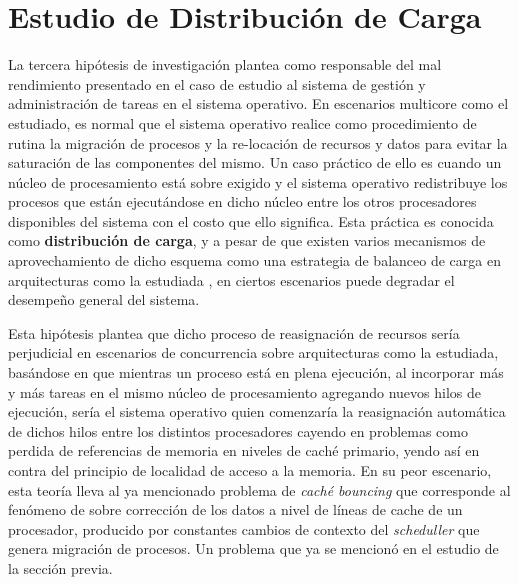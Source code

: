 \chapter{Estudio de Distribución de Carga}
La tercera hipótesis de investigación plantea como responsable del mal rendimiento presentado en el caso de estudio al sistema de gestión y administración de tareas en el sistema operativo. En escenarios multicore como el estudiado, es normal que el sistema operativo realice como procedimiento de rutina la migración de procesos y la re-locación de recursos y datos para evitar la saturación de las componentes del mismo. Un caso práctico de ello es cuando un núcleo de procesamiento está sobre exigido y el sistema operativo redistribuye los procesos que están ejecutándose en dicho núcleo entre los otros procesadores disponibles del sistema con el costo que ello significa. Esta práctica es conocida como \textbf{distribución de carga}, y a pesar de que existen varios mecanismos de aprovechamiento de dicho esquema como una estrategia de balanceo de carga en arquitecturas como la estudiada \cite{paper:NUMA, techsession:numaMemoryThreadsPerformance}, en ciertos escenarios puede degradar el desempeño general del sistema.

Esta hipótesis plantea que dicho proceso de reasignación de recursos sería perjudicial en escenarios de concurrencia sobre arquitecturas como la estudiada, basándose en que mientras un proceso está en plena ejecución, al incorporar más y más tareas en el mismo núcleo de procesamiento agregando nuevos hilos de ejecución, sería el sistema operativo quien comenzaría la reasignación automática de dichos hilos entre los distintos procesadores cayendo en problemas como perdida de referencias de memoria en niveles de caché primario, yendo así en contra del principio de localidad de acceso a la memoria. En su peor escenario, esta teoría lleva al ya mencionado problema de \emph{caché bouncing} que corresponde al fenómeno de sobre corrección de los datos a nivel de líneas de cache de un procesador, producido por constantes cambios de contexto del \emph{scheduller} que genera migración de procesos. Un problema que ya se mencionó en el estudio de la sección previa.

